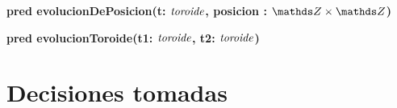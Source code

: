 \documentclass[a4paper]{article}
\newcommand{\tupla}[2]{#1 \times #2}
\begin{document}
\begin{ejercicio}[:]
\textbf{pred evolucionDePosicion(t: $\textit{toroide}$, posicion : $\tupla{\ent}{\ent}$)}

\end{ejercicio}


\begin{ejercicio}[:]
\textbf{pred evolucionToroide(t1: $\textit{toroide}$, t2: $\textit{toroide}$)}

\end{ejercicio}




\section{Decisiones tomadas}
\end{document}
